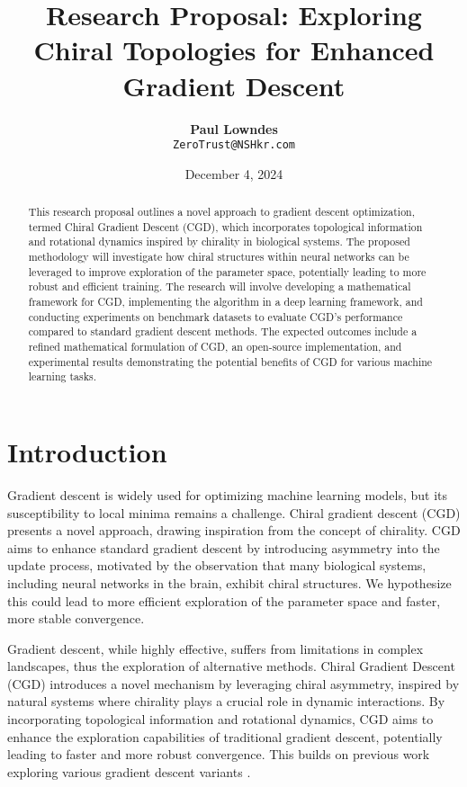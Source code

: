 \documentclass[12pt, a4paper]{article}
\title{\vspace{-2cm}\textbf{Research Proposal: Exploring Chiral Topologies for Enhanced Gradient Descent}}
\author{\textbf{Paul Lowndes} \\ \texttt{ZeroTrust@NSHkr.com}}
\date{\small December 4, 2024} %
\begin{document}
\maketitle
\vspace{-1.5em} %

\begin{abstract}
This research proposal outlines a novel approach to gradient descent optimization, termed Chiral Gradient Descent (CGD), which incorporates topological information and rotational dynamics inspired by chirality in biological systems. The proposed methodology will investigate how chiral structures within neural networks can be leveraged to improve exploration of the parameter space, potentially leading to more robust and efficient training. The research will involve developing a mathematical framework for CGD, implementing the algorithm in a deep learning framework, and conducting experiments on benchmark datasets to evaluate CGD's performance compared to standard gradient descent methods. The expected outcomes include a refined mathematical formulation of CGD, an open-source implementation, and experimental results demonstrating the potential benefits of CGD for various machine learning tasks.
\end{abstract}

\section{Introduction}

Gradient descent is widely used for optimizing machine learning models, but its susceptibility to local minima remains a challenge. Chiral gradient descent (CGD) presents a novel approach, drawing inspiration from the concept of chirality. CGD aims to enhance standard gradient descent by introducing asymmetry into the update process, motivated by the observation that many biological systems, including neural networks in the brain, exhibit chiral structures. We hypothesize this could lead to more efficient exploration of the parameter space and faster, more stable convergence.

Gradient descent, while highly effective, suffers from limitations in complex landscapes, thus the exploration of alternative methods. Chiral Gradient Descent (CGD) introduces a novel mechanism by leveraging chiral asymmetry, inspired by natural systems where chirality plays a crucial role in dynamic interactions. By incorporating topological information and rotational dynamics, CGD aims to enhance the exploration capabilities of traditional gradient descent, potentially leading to faster and more robust convergence.  This builds on previous work exploring various gradient descent variants \cite{induraj2023variants}.
\end{document}
